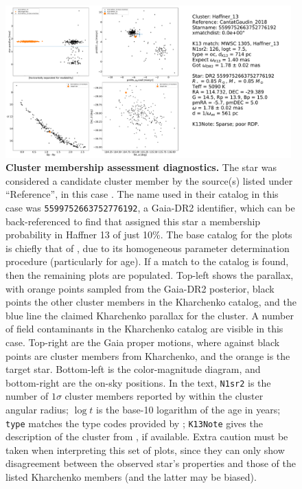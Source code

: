 \documentclass[12pt,twocolumn,tighten]{aastex62}
\begin{document}
\begin{figure}[!h]
	\begin{center}
		\leavevmode
		\includegraphics[width=0.98\textwidth]{gaiatwo0005599752663752776192-0007_page05.pdf}
	\end{center}
	\vspace{-0.5cm}
	\caption{
		{\bf Cluster membership assessment diagnostics.}
    The star was considered a candidate cluster member by the
    source(s) listed under ``Reference'', in this case
    \citet{cantat-gaudin_gaia_2018}.  The name used in their catalog
    in this case was \texttt{5599752663752776192}, a Gaia-DR2
    identifier, which can be back-referenced to find that
    \citet{cantat-gaudin_gaia_2018} assigned this star a membership
    probability in Haffner 13 of just 10\%.
    The base catalog for the plots is chiefly that of
    \citet{Kharchenko_et_al_2013}, due to its homogeneous parameter
    determination procedure (particularly for age).  If a match to the
    \citet{Kharchenko_et_al_2013} catalog is found, then the remaining
    plots are populated.  Top-left shows the parallax, with orange
    points sampled from the Gaia-DR2 posterior, black points the other
    cluster members in the Kharchenko catalog, and the blue line the
    claimed Kharchenko parallax for the cluster.  A number of
    field contaminants in the Kharchenko catalog are visible in this
    case.  Top-right are the Gaia proper motions, where against black
    points are cluster members from Kharchenko, and the orange is the
    target star.  Bottom-left is the color-magnitude diagram, and
    bottom-right are the on-sky positions.  In the text,
    \texttt{N1sr2} is the number of $1\sigma$ cluster members reported
    by \citet{Kharchenko_et_al_2013} within the cluster angular
    radius; $\log t$ is the base-10 logarithm of the age in years;
    \texttt{type} matches the type codes provided by
    \citet{Kharchenko_et_al_2013}; \texttt{K13Note} gives the
    description of the cluster from \citet{Kharchenko_et_al_2013}, if
    available.
    Extra caution must be taken when interpreting this set of plots,
    since they can only show disagreement between the observed star's
    properties and those of the listed Kharchenko members (and the
    latter may be biased).
		\label{fig:pg5}
	}
\end{figure}
\end{document}
